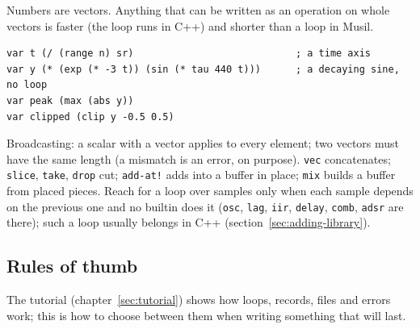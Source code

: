 \documentclass[11pt,a4paper]{article}
\newcommand{\musil}[1]{\lstinline[style=musilinline]{#1}}
\begin{document}
Numbers are vectors. Anything that can be written as an operation on whole vectors is
faster (the loop runs in C++) and shorter than a loop in Musil.

\begin{lstlisting}
var t (/ (range n) sr)                            ; a time axis
var y (* (exp (* -3 t)) (sin (* tau 440 t)))      ; a decaying sine, no loop
var peak (max (abs y))
var clipped (clip y -0.5 0.5)
\end{lstlisting}

Broadcasting: a scalar with a vector applies to every element; two vectors must have the
same length (a mismatch is an error, on purpose). \musil{vec} concatenates; \musil{slice},
\musil{take}, \musil{drop} cut; \musil{add-at!} adds into a buffer in place; \musil{mix}
builds a buffer from placed pieces. Reach for a loop over samples only when each sample
depends on the previous one and no builtin does it (\musil{osc}, \musil{lag}, \musil{iir},
\musil{delay}, \musil{comb}, \musil{adsr} are there); such a loop usually belongs in C++
(section~\ref{sec:adding-library}).

\subsection{Rules of thumb}

The tutorial (chapter~\ref{sec:tutorial}) shows how loops, records, files and errors
work; this is how to choose between them when writing something that will last.
\end{document}
